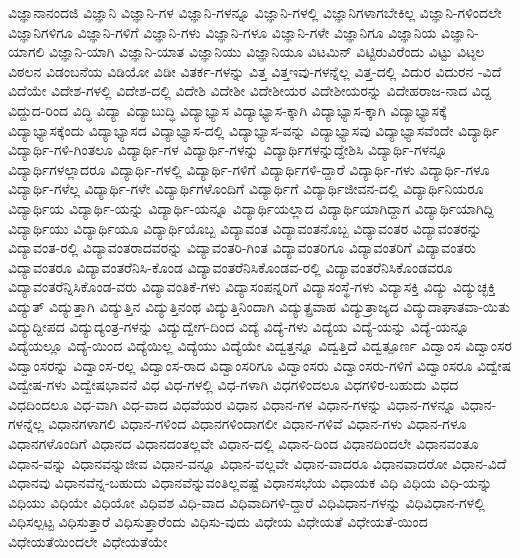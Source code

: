 {ವಿಜ್ಞಾನಾನಂದಜಿ
ವಿಜ್ಞಾನಿ
ವಿಜ್ಞಾನಿ-ಗಳ
ವಿಜ್ಞಾನಿ-ಗಳನ್ನೂ
ವಿಜ್ಞಾನಿ-ಗಳಲ್ಲಿ
ವಿಜ್ಞಾನಿಗಳಾಗಬೇಕಿಲ್ಲ
ವಿಜ್ಞಾನಿ-ಗಳಿಂದಲೇ
ವಿಜ್ಞಾನಿಗಳಿಗೂ
ವಿಜ್ಞಾನಿ-ಗಳಿಗೆ
ವಿಜ್ಞಾನಿ-ಗಳು
ವಿಜ್ಞಾನಿ-ಗಳೂ
ವಿಜ್ಞಾನಿ-ಗಳೇ
ವಿಜ್ಞಾನಿಗೂ
ವಿಜ್ಞಾನಿಯ
ವಿಜ್ಞಾನಿ-ಯಾಗಲಿ
ವಿಜ್ಞಾನಿ-ಯಾಗಿ
ವಿಜ್ಞಾನಿ-ಯಾತ
ವಿಜ್ಞಾನಿಯು
ವಿಜ್ಞಾನಿಯೂ
ವಿಟಮಿನ್
ವಿಟ್ಟಿರುವಿರೆಂದು
ವಿಟ್ಟು
ವಿಟ್ಠಲ
ವಿಠಲನ
ವಿಡಂಬನೆಯ
ವಿಡಿಯೋ
ವಿಡೀ
ವಿತರ್ಕ-ಗಳನ್ನು
ವಿತ್ತ
ವಿತ್ತಇವು-ಗಳನ್ನೆಲ್ಲ
ವಿತ್ತ-ದಲ್ಲಿ
ವಿದುರ
ವಿದುರನ
-ವಿದೆ
ವಿದೆಯೇ
ವಿದೇಶ-ಗಳಲ್ಲಿ
ವಿದೇಶ-ದಲ್ಲಿ
ವಿದೇಶಿ
ವಿದೇಶೀ
ವಿದೇಶೀಯರ
ವಿದೇಶೀಯರನ್ನು
ವಿದೇಹರಾಜ-ನಾದ
ವಿದ್ದ
ವಿದ್ದುದ-ರಿಂದ
ವಿದ್ಧಿ
ವಿದ್ಯಾ
ವಿದ್ಯಾಬುದ್ಧಿ
ವಿದ್ಯಾಭ್ಯಾಸ
ವಿದ್ಯಾಭ್ಯಾಸ-ಕ್ಕಾಗಿ
ವಿದ್ಯಾಭ್ಯಾಸ-ಕ್ಕಾಗಿ
ವಿದ್ಯಾಭ್ಯಾಸಕ್ಕೆ
ವಿದ್ಯಾಭ್ಯಾಸಕ್ಕೆಂದು
ವಿದ್ಯಾಭ್ಯಾಸದ
ವಿದ್ಯಾಭ್ಯಾಸ-ದಲ್ಲಿ
ವಿದ್ಯಾಭ್ಯಾಸ-ವನ್ನು
ವಿದ್ಯಾಭ್ಯಾಸವು
ವಿದ್ಯಾಭ್ಯಾಸವೆಂದೇ
ವಿದ್ಯಾರ್ಥಿ
ವಿದ್ಯಾರ್ಥಿ-ಗಳಿ-ಗಿಂತಲೂ
ವಿದ್ಯಾರ್ಥಿ-ಗಳ
ವಿದ್ಯಾರ್ಥಿ-ಗಳನ್ನು
ವಿದ್ಯಾರ್ಥಿಗಳನ್ನುದ್ದೇಶಿಸಿ
ವಿದ್ಯಾರ್ಥಿ-ಗಳನ್ನೂ
ವಿದ್ಯಾರ್ಥಿಗಳಲ್ಲಾದರೂ
ವಿದ್ಯಾರ್ಥಿ-ಗಳಲ್ಲಿ
ವಿದ್ಯಾರ್ಥಿ-ಗಳಿಗೆ
ವಿದ್ಯಾರ್ಥಿಗಳಿ-ದ್ದಾರೆ
ವಿದ್ಯಾರ್ಥಿ-ಗಳು
ವಿದ್ಯಾರ್ಥಿ-ಗಳೂ
ವಿದ್ಯಾರ್ಥಿ-ಗಳೆಲ್ಲ
ವಿದ್ಯಾರ್ಥಿ-ಗಳೇ
ವಿದ್ಯಾರ್ಥಿಗಳೊಂದಿಗೆ
ವಿದ್ಯಾರ್ಥಿಗೆ
ವಿದ್ಯಾರ್ಥಿಜೀವನ-ದಲ್ಲಿ
ವಿದ್ಯಾರ್ಥಿನಿಯರೂ
ವಿದ್ಯಾರ್ಥಿಯ
ವಿದ್ಯಾರ್ಥಿ-ಯನ್ನು
ವಿದ್ಯಾರ್ಥಿ-ಯನ್ನೂ
ವಿದ್ಯಾರ್ಥಿಯಲ್ಲಾದ
ವಿದ್ಯಾರ್ಥಿಯಾಗಿದ್ದಾಗ
ವಿದ್ಯಾರ್ಥಿಯಾಗಿದ್ದಿ
ವಿದ್ಯಾರ್ಥಿಯು
ವಿದ್ಯಾರ್ಥಿಯೂ
ವಿದ್ಯಾರ್ಥಿಯೊಬ್ಬ
ವಿದ್ಯಾವಂತ
ವಿದ್ಯಾವಂತನೊಬ್ಬ
ವಿದ್ಯಾವಂತರ
ವಿದ್ಯಾವಂತರನ್ನು
ವಿದ್ಯಾವಂತ-ರಲ್ಲಿ
ವಿದ್ಯಾವಂತರಾದವರನ್ನು
ವಿದ್ಯಾವಂತರಿ-ಗಿಂತ
ವಿದ್ಯಾವಂತರಿಗೂ
ವಿದ್ಯಾವಂತರಿಗೆ
ವಿದ್ಯಾವಂತರು
ವಿದ್ಯಾವಂತರೂ
ವಿದ್ಯಾವಂತರೆನಿಸಿ-ಕೊಂಡ
ವಿದ್ಯಾವಂತರೆನಿಸಿಕೊಂಡವ-ರಲ್ಲಿ
ವಿದ್ಯಾವಂತರೆನಿಸಿಕೊಂಡವರೂ
ವಿದ್ಯಾವಂತರೆನ್ನಿಸಿಕೊಂಡ-ವರು
ವಿದ್ಯಾವಂತಿಕೆ-ಗಳು
ವಿದ್ಯಾಸಂಪನ್ನರಿಗೆ
ವಿದ್ಯಾಸಂಸ್ಥೆ-ಗಳು
ವಿದ್ಯಾಸಕ್ತಿ
ವಿದ್ಯು
ವಿದ್ಯುಚ್ಛಕ್ತಿ
ವಿದ್ಯುತ್
ವಿದ್ಯುತ್ತಾಗಿ
ವಿದ್ಯುತ್ತಿನ
ವಿದ್ಯುತ್ತಿನಂಥ
ವಿದ್ಯುತ್ತಿನಿಂದಾಗಿ
ವಿದ್ಯುತ್ಪ್ರವಾಹ
ವಿದ್ಯುತ್ರಾಜ್ಯದ
ವಿದ್ಯುದಾಘಾತವಾ-ಯಿತು
ವಿದ್ಯುದ್ದೀಪದ
ವಿದ್ಯುದ್ಯಂತ್ರ-ಗಳನ್ನು
ವಿದ್ಯುದ್ವೇಗ-ದಿಂದ
ವಿದ್ಯೆ
ವಿದ್ಯೆ-ಗಳು
ವಿದ್ಯೆಯ
ವಿದ್ಯೆ-ಯನ್ನು
ವಿದ್ಯೆ-ಯನ್ನೂ
ವಿದ್ಯೆಯಲ್ಲೂ
ವಿದ್ಯೆ-ಯಿಂದ
ವಿದ್ಯೆಯಿಲ್ಲ
ವಿದ್ಯೆಯು
ವಿದ್ಯೆಯೇ
ವಿದ್ವತ್ತನ್ನೂ
ವಿದ್ವತ್ತಿದೆ
ವಿದ್ವತ್ಪೂರ್ಣ
ವಿದ್ವಾಂಸ
ವಿದ್ವಾಂಸರ
ವಿದ್ವಾಂಸರನ್ನು
ವಿದ್ವಾಂಸ-ರಲ್ಲ
ವಿದ್ವಾಂಸ-ರಾದ
ವಿದ್ವಾಂಸರಿಗೂ
ವಿದ್ವಾಂಸರು
ವಿದ್ವಾಂಸರು-ಗಳಿಗೆ
ವಿದ್ವಾಂಸರೂ
ವಿದ್ವೇಷ
ವಿದ್ವೇಷ-ಗಳು
ವಿದ್ವೇಷಭಾವನೆ
ವಿಧ
ವಿಧ-ಗಳಲ್ಲಿ
ವಿಧ-ಗಳಾಗಿ
ವಿಧಗಳಿಂದಲೂ
ವಿಧಗಳಿರ-ಬಹುದು
ವಿಧದ
ವಿಧದಿಂದಲೂ
ವಿಧ-ವಾಗಿ
ವಿಧ-ವಾದ
ವಿಧವೆಯರ
ವಿಧಾನ
ವಿಧಾನ-ಗಳ
ವಿಧಾನ-ಗಳನ್ನು
ವಿಧಾನ-ಗಳನ್ನೂ
ವಿಧಾನ-ಗಳನ್ನೆಲ್ಲ
ವಿಧಾನಗಳಾಗಲಿ
ವಿಧಾನ-ಗಳಿಂದ
ವಿಧಾನಗಳಿಂದಾಗಲೀ
ವಿಧಾನ-ಗಳಿವೆ
ವಿಧಾನ-ಗಳು
ವಿಧಾನ-ಗಳೂ
ವಿಧಾನಗಳೊಂದಿಗೆ
ವಿಧಾನದ
ವಿಧಾನದಂತಲ್ಲವೇ
ವಿಧಾನ-ದಲ್ಲಿ
ವಿಧಾನ-ದಿಂದ
ವಿಧಾನದಿಂದಲೇ
ವಿಧಾನವಂತೂ
ವಿಧಾನ-ವನ್ನು
ವಿಧಾನವನ್ನುಜೀವ
ವಿಧಾನ-ವನ್ನೂ
ವಿಧಾನ-ವಲ್ಲವೇ
ವಿಧಾನ-ವಾದರೂ
ವಿಧಾನವಾದರೋ
ವಿಧಾನ-ವಿದೆ
ವಿಧಾನವು
ವಿಧಾನವೆನ್ನ-ಬಹುದು
ವಿಧಾನವೆನ್ನುವಂತಿಲ್ಲವಷ್ಟೆ
ವಿಧಾನಸಭೆಯ
ವಿಧಾಯಕ
ವಿಧಿ
ವಿಧಿಯ
ವಿಧಿ-ಯನ್ನು
ವಿಧಿಯು
ವಿಧಿಯೇ
ವಿಧಿಯೋ
ವಿಧಿವಶ
ವಿಧಿ-ವಾದ
ವಿಧಿವಾದಿಗಳಿ-ದ್ದಾರೆ
ವಿಧಿವಿಧಾನ-ಗಳನ್ನು
ವಿಧಿವಿಧಾನ-ಗಳಲ್ಲಿ
ವಿಧಿಸಲ್ಪಟ್ಟ
ವಿಧಿಸುತ್ತಾರೆ
ವಿಧಿಸುತ್ತಾರೆಂದು
ವಿಧಿಸು-ವುದು
ವಿಧೇಯ
ವಿಧೇಯತೆ
ವಿಧೇಯತೆ-ಯಿಂದ
ವಿಧೇಯತೆಯಿಂದಲೇ
ವಿಧೇಯತೆಯೇ
}
